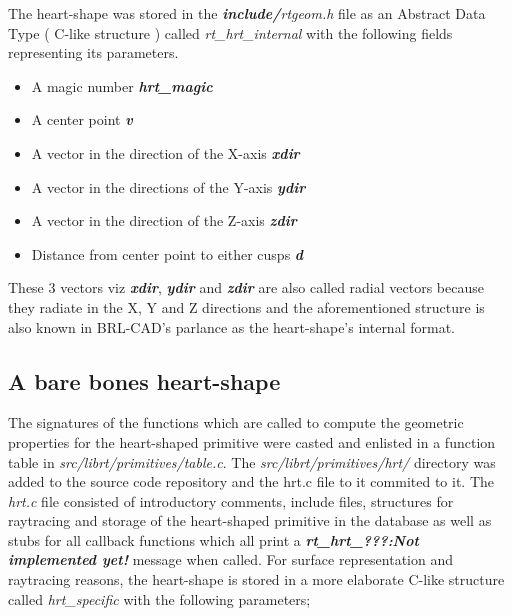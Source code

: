 The   heart-­shape   was   stored   in   the   \textit{\textbf{include/}rtgeom.h}   file   as   an   Abstract   Data  
Type   ( C-­like   structure )   called   \textit{rt\_hrt\_internal}   with   the   following   fields  
representing its parameters.
\begin{itemize}  
\item A magic number \textit{\textbf{hrt\_magic }} 
\item A center point \textit{\textbf{v }} 
\item A vector in the direction of the X-­axis \textit{\textbf{xdir}}  
\item A vector in the directions of the Y­-axis \textit{\textbf{ydir}}  
\item A vector in the direction of the Z­-axis \textit{\textbf{zdir}}  
\item Distance from center point to either cusps \textit{\textbf{d}} 
\end{itemize} 
These   3    vectors viz \textit{\textbf{xdir}}, \textit{\textbf{ydir}} and \textit{\textbf{zdir}}   are   also   called   radial   vectors   because   they   radiate   in   the  X,   Y   and   Z   directions   and   the   aforementioned   structure   is   also   known   in  BRL-­CAD's parlance as the heart-­shape's internal format.

\subsection{A bare bones heart­-shape}

The   signatures   of   the   functions   which   are   called   to   compute   the  
geometric   properties   for   the   heart-­shaped   primitive   were   casted   and   enlisted   in  
a   function   table   in   \textit{src/librt/primitives/table.c}. The \textit{src/librt/primitives/hrt/}
 directory was added to the source code repository   and  the   hrt.c   file   to   it commited to it. 
The   \textit{hrt.c}   file   consisted   of   introductory   comments,   include  
files,   structures   for   raytracing   and   storage   of   the   heart­-shaped   primitive   in   the  
database   as   well   as   stubs   for   all   callback   functions   which   all   print   a  
\textit{\textbf{\“rt\_hrt\_???:Not   implemented   yet!\”}}   message   when   called.   For   surface  
representation   and   raytracing   reasons,   the   heart-­shape   is   stored   in   a   more  
elaborate C-­like structure called \textit{hrt\_specific} with the following parameters;  


